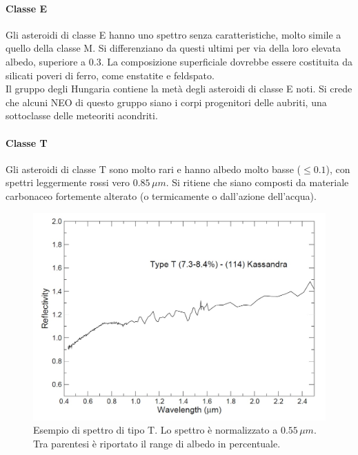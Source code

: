 \documentclass[a4paper,11pt,openright]{book}
\begin{document}
\paragraph*{Classe E}
Gli asteroidi di classe E hanno uno spettro senza caratteristiche, molto simile a quello della classe M. Si differenziano da questi ultimi per via della loro elevata albedo, superiore a $0.3$. La composizione superficiale dovrebbe essere costituita da silicati poveri di ferro, come enstatite e feldspato.\\
Il gruppo degli Hungaria contiene la metà degli asteroidi di classe E noti. Si crede che alcuni NEO di questo gruppo siano i corpi progenitori delle aubriti, una sottoclasse delle meteoriti acondriti.

\paragraph*{Classe T}
Gli asteroidi di classe T sono molto rari e hanno albedo molto basse ($\leq 0.1$), con spettri leggermente rossi vero $0.85\,\mu m$. Si ritiene che siano composti da materiale carbonaceo fortemente
alterato (o termicamente o dall'azione dell'acqua).

\begin{figure}[!h]
    \centering
    \includegraphics[scale=0.3]{figure/spettro_t.jpg}
    \caption[Esempio di spettro di tipo T.]{Esempio di spettro di tipo T. Lo spettro è normalizzato a $0.55\,\mu m$. Tra parentesi è riportato il range di albedo in percentuale. \citep{magrin_spectroscopic_nodate}}
    \label{spettro_t}
\end{figure}
\end{document}

